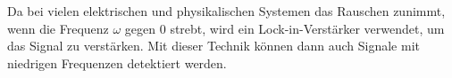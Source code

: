 Da bei vielen elektrischen und physikalischen Systemen das Rauschen zunimmt, wenn
die Frequenz $\omega$ gegen 0 strebt\cite{enet}, wird ein Lock-in-Verstärker
verwendet, um das Signal zu verstärken. Mit dieser Technik können dann auch
Signale mit niedrigen Frequenzen detektiert werden.
